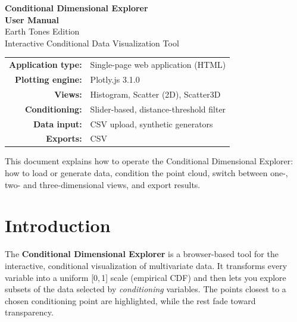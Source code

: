 \documentclass[11pt,a4paper]{article}
\begin{document}
\begin{titlepage}
\centering
\vspace*{3cm}

{\Huge\bfseries\color{accent} Conditional Dimensional Explorer}\\[0.4cm]
{\LARGE\bfseries User Manual}\\[1.5cm]

{\large Earth Tones Edition}\\[0.3cm]
{\large Interactive Conditional Data Visualization Tool}\\[3cm]

\begin{tabular}{rl}
\textbf{Application type:} & Single-page web application (HTML) \\
\textbf{Plotting engine:} & Plotly.js 3.1.0 \\
\textbf{Views:} & Histogram, Scatter (2D), Scatter3D \\
\textbf{Conditioning:} & Slider-based, distance-threshold filter \\
\textbf{Data input:} & CSV upload, synthetic generators \\
\textbf{Exports:} & CSV \\
\end{tabular}

\vfill

{\small This document explains how to operate the Conditional Dimensional Explorer: how to load or generate data, condition the point cloud, switch between one-, two- and three-dimensional views, and export results.}

\end{titlepage}

\tableofcontents
\newpage

\section{Introduction}

The \textbf{Conditional Dimensional Explorer} is a browser-based tool for the interactive, conditional visualization of multivariate data. It transforms every variable into a uniform [0,\,1] scale (empirical CDF) and then lets you explore subsets of the data selected by \emph{conditioning} variables. The points closest to a chosen conditioning point are highlighted, while the rest fade toward transparency.
\end{document}
